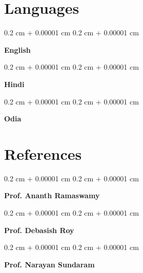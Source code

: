 \documentclass[10pt, letterpaper]{article}
\newenvironment{onecolentry}{
    \begin{adjustwidth}{
        0.2 cm + 0.00001 cm
    }{
        0.2 cm + 0.00001 cm
    }
}{
    \end{adjustwidth}
} %
\begin{document}
    
    \section{Languages}



        
        \begin{onecolentry}
            \textbf{English}
        \end{onecolentry}


        \vspace{0.2 cm}

        \begin{onecolentry}
            \textbf{Hindi}
        \end{onecolentry}


        \vspace{0.2 cm}

        \begin{onecolentry}
            \textbf{Odia}
        \end{onecolentry}



    
    \section{References}



        
        \begin{onecolentry}
            \textbf{Prof. Ananth Ramaswamy}
        \end{onecolentry}


        \vspace{0.2 cm}

        \begin{onecolentry}
            \textbf{Prof. Debasish Roy}
        \end{onecolentry}


        \vspace{0.2 cm}

        \begin{onecolentry}
            \textbf{Prof. Narayan Sundaram}
        \end{onecolentry}



    
\end{document}
